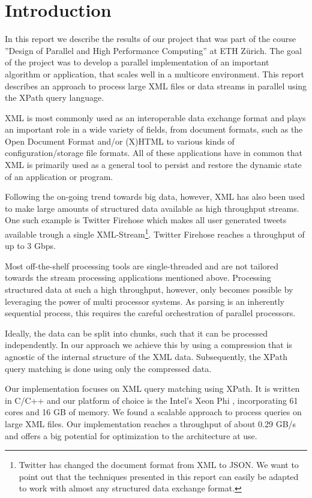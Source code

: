 \section{Introduction}\label{sec:intro}

In this report we describe the results of our project that was part of the
course ''Design of Parallel and High Performance Computing'' at ETH Z\"urich.
The goal of the project was to develop a parallel implementation of an important
algorithm or application, that scales well in a multicore environment. This
report describes an approach to process large XML files or data streams in
parallel using the XPath query language.

XML is most commonly used as an interoperable data exchange format and plays 
an important role in a wide variety of fields, from document formats, such as the 
Open Document Format \cite{opendocSpec} and/or (X)HTML to various kinds of
configuration/storage file formats. All of these applications have in common that XML is
primarily used as a general tool to persist and restore the dynamic state of an
application or program.

Following the on-going trend towards big data, however, XML has also been used
to make large amounts of structured data available as high throughput streams.
One such example is Twitter Firehose which makes all user generated tweets
available trough a single XML-Stream\footnote{Twitter has changed the document
format from XML to JSON. We want to point out that the techniques presented in this
report can easily be adapted to work with almost any structured data exchange
format.}. Twitter Firehose reaches a throughput of up to 3 Gbps.

Most off-the-shelf processing tools are single-threaded and are not tailored towards 
the stream processing applications mentioned above. Processing structured data at 
such a high throughput, however, only becomes possible by leveraging the power of 
multi processor systems. As parsing is an inherently sequential process, this requires 
the careful orchestration of parallel processors.

Ideally, the data can be split into chunks, such that it can be processed independently.
In our approach we achieve this by using a compression that is agnostic of the
internal structure of the XML data. Subsequently, the XPath query matching is done 
using only the compressed data.

Our implementation focuses on XML query matching using XPath. It is written in
C/C++ and our platform of choice is the Intel's Xeon Phi \cite{IntelXeon}, incorporating 61 cores
and 16 GB of memory. We found a scalable approach to process queries on large
XML files. Our implementation reaches a throughput of about 0.29 GB/s and offers
a big potential for optimization to the architecture at use. 

